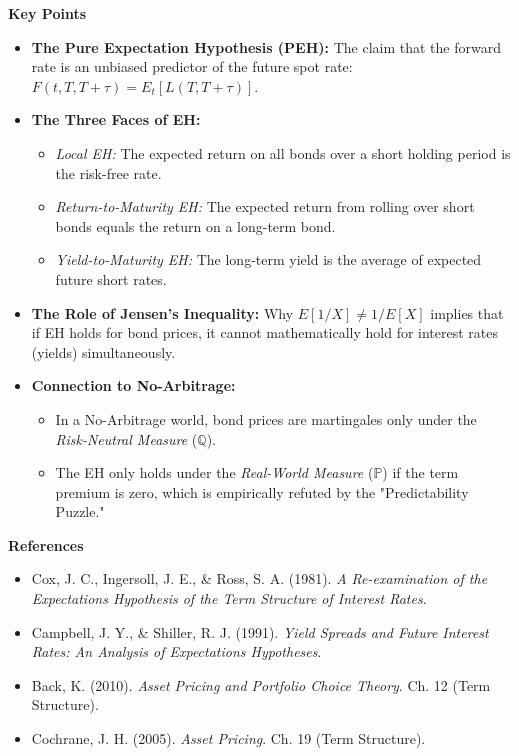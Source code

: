 \documentclass[12pt,a4paper]{article}
\begin{document}
\medskip
\textbf{Key Points}
\begin{itemize}
\item \textbf{The Pure Expectation Hypothesis (PEH):} The claim that the forward rate is an unbiased predictor of the future spot rate: $F(t,T,T+\tau)=E_t[L(T,T+\tau)]$.

\item \textbf{The Three Faces of EH:} 
    \begin{itemize}
        \item \textit{Local EH:} The expected return on all bonds over a short holding period is the risk-free rate.
        \item \textit{Return-to-Maturity EH:} The expected return from rolling over short bonds equals the return on a long-term bond.
        \item \textit{Yield-to-Maturity EH:} The long-term yield is the average of expected future short rates.
    \end{itemize}

\item \textbf{The Role of Jensen's Inequality:} Why $E[1/X] \neq 1/E[X]$ implies that if EH holds for bond prices, it cannot mathematically hold for interest rates (yields) simultaneously.

\item \textbf{Connection to No-Arbitrage:} 
    \begin{itemize}
        \item In a No-Arbitrage world, bond prices are martingales only under the \textit{Risk-Neutral Measure} ($\mathbb{Q}$). 
        \item The EH only holds under the \textit{Real-World Measure} ($\mathbb{P}$) if the term premium is zero, which is empirically refuted by the "Predictability Puzzle."
    \end{itemize}

\end{itemize}

\medskip
\textbf{References}
\begin{itemize}
\item[-] Cox, J. C., Ingersoll, J. E., \& Ross, S. A. (1981). \textit{A Re-examination of the Expectations Hypothesis of the Term Structure of Interest Rates}.
\item[-] Campbell, J. Y., \& Shiller, R. J. (1991). \textit{Yield Spreads and Future Interest Rates: An Analysis of Expectations Hypotheses}.
\item[-] Back, K. (2010). \textit{Asset Pricing and Portfolio Choice Theory}. Ch. 12 (Term Structure).
\item[-] Cochrane, J. H. (2005). \textit{Asset Pricing}. Ch. 19 (Term Structure).
\end{itemize}
\end{document}
